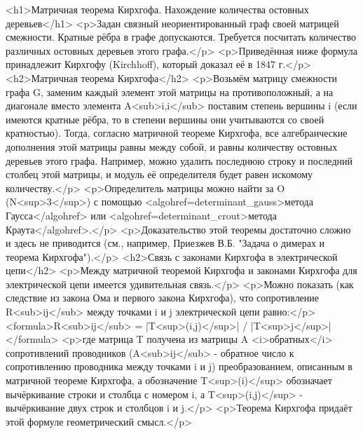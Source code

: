 <h1>Матричная теорема Кирхгофа. Нахождение количества остовных деревьев</h1>
<p>Задан связный неориентированный граф своей матрицей смежности. Кратные рёбра в графе допускаются. Требуется посчитать количество различных остовных деревьев этого графа.</p>
<p>Приведённая ниже формула принадлежит Кирхгофу (Kirchhoff), который доказал её в 1847 г.</p>
<h2>Матричная теорема Кирхгофа</h2>
<p>Возьмём матрицу смежности графа G, заменим каждый элемент этой матрицы на противоположный, а на диагонале вместо элемента A<sub>i,i</sub> поставим степень вершины i (если имеются кратные рёбра, то в степени вершины они учитываются со своей кратностью). Тогда, согласно матричной теореме Кирхгофа, все алгебраические дополнения этой матрицы равны между собой, и равны количеству остовных деревьев этого графа. Например, можно удалить последнюю строку и последний столбец этой матрицы, и модуль её определителя будет равен искомому количеству.</p>
<p>Определитель матрицы можно найти за O (N<sup>3</sup>) с помощью <algohref=determinant_gauss>метода Гаусса</algohref> или <algohref=determinant_crout>метода Краута</algohref>.</p>
<p>Доказательство этой теоремы достаточно сложно и здесь не приводится (см., например, Приезжев В.Б. "Задача о димерах и теорема Кирхгофа").</p>
<h2>Связь с законами Кирхгофа в электрической цепи</h2>
<p>Между матричной теоремой Кирхгофа и законами Кирхгофа для электрической цепи имеется удивительная связь.</p>
<p>Можно показать (как следствие из закона Ома и первого закона Кирхгофа), что сопротивление R<sub>ij</sub> между точками i и j электрической цепи равно:</p>
<formula>R<sub>ij</sub> = |T<sup>(i,j)</sup>| / |T<sup>j</sup>|</formula>
<p>где матрица T получена из матрицы A <i>обратных</i> сопротивлений проводников (A<sub>ij</sub> - обратное число к сопротивлению проводника между точками i и j) преобразованием, описанным в матричной теореме Кирхгофа, а обозначение T<sup>(i)</sup> обозначает вычёркивание строки и столбца с номером i, а T<sup>(i,j)</sup> - вычёркивание двух строк и столбцов i и j.</p>
<p>Теорема Кирхгофа придаёт этой формуле геометрический смысл.</p>